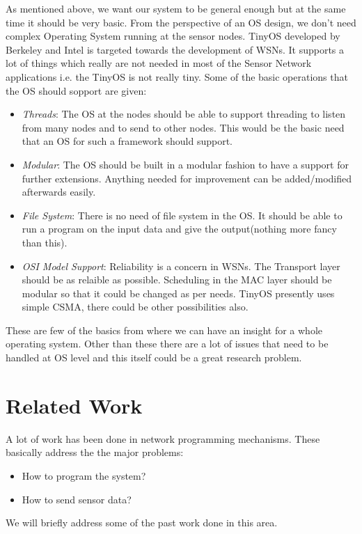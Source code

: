 \documentclass[twocolumn]{article}
\begin{document}
As mentioned above, we want our system to be general enough but at the same time it should be very basic. From the perspective of an OS design, we don't need complex Operating System running at the sensor nodes. TinyOS developed by Berkeley and Intel is targeted towards the development of WSNs. It supports a lot of things which really are not needed in most of the Sensor Network applications i.e. the TinyOS is not really tiny. Some of the basic operations that the OS should sopport are given:
\begin{itemize}
\item \emph{Threads}: The OS at the nodes should be able to support threading to listen from many nodes and to send to other nodes. This would be the basic need that an OS for such a framework should support.

\item \emph{Modular}: The OS should be built in a modular fashion to have a support for further extensions. Anything needed for improvement can be added/modified afterwards easily.

\item \emph{File System}: There is no need of file system in the OS. It should be able to run a program on the input data and give the output(nothing more fancy than this).

\item \emph{OSI Model Support}: Reliability is a concern in WSNs. The Transport layer should be as relaible as possible. Scheduling in the MAC layer should be modular so that it could be changed as per needs. TinyOS presently uses simple CSMA, there could be other possibilities also.
\end{itemize}

These are few of the basics from where we can have an insight for a whole operating system. Other than these there are a lot of issues that need to be handled at OS level and this itself could be a great research problem.

\section{Related Work}

A lot of work has been done in network programming mechanisms. These basically address the the major problems:
\begin{itemize}
\item How to program the system?
\item How to send sensor data?
\end{itemize}
We will briefly address some of the past work done in this area.
\end{document}
